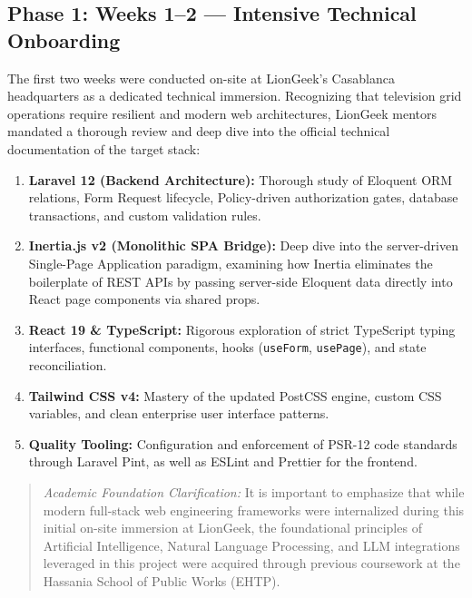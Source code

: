 \documentclass[12pt,a4paper,oneside]{report}
\begin{document}
\subsection{Phase 1: Weeks 1--2 --- Intensive Technical Onboarding}
The first two weeks were conducted on-site at LionGeek's Casablanca headquarters as a dedicated technical immersion. Recognizing that television grid operations require resilient and modern web architectures, LionGeek mentors mandated a thorough review and deep dive into the official technical documentation of the target stack:
\begin{enumerate}
    \item \textbf{Laravel 12 (Backend Architecture):} Thorough study of Eloquent ORM relations, Form Request lifecycle, Policy-driven authorization gates, database transactions, and custom validation rules.
    \item \textbf{Inertia.js v2 (Monolithic SPA Bridge):} Deep dive into the server-driven Single-Page Application paradigm, examining how Inertia eliminates the boilerplate of REST APIs by passing server-side Eloquent data directly into React page components via shared props.
    \item \textbf{React 19 \& TypeScript:} Rigorous exploration of strict TypeScript typing interfaces, functional components, hooks (\texttt{useForm}, \texttt{usePage}), and state reconciliation.
    \item \textbf{Tailwind CSS v4:} Mastery of the updated PostCSS engine, custom CSS variables, and clean enterprise user interface patterns.
    \item \textbf{Quality Tooling:} Configuration and enforcement of PSR-12 code standards through Laravel Pint, as well as ESLint and Prettier for the frontend.
\end{enumerate}

\begin{quote}
\textit{Academic Foundation Clarification:} It is important to emphasize that while modern full-stack web engineering frameworks were internalized during this initial on-site immersion at LionGeek, the foundational principles of Artificial Intelligence, Natural Language Processing, and LLM integrations leveraged in this project were acquired through previous coursework at the Hassania School of Public Works (EHTP).
\end{quote}
\end{document}
